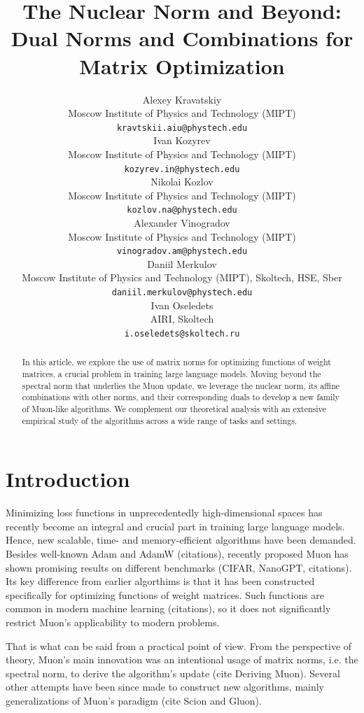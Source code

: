 \documentclass{article} %
\title{The Nuclear Norm and Beyond: Dual Norms and Combinations for Matrix Optimization}
\author{Alexey Kravatskiy \\
Moscow Institute of Physics and Technology (MIPT) \\
\texttt{kravtskii.aiu@phystech.edu} \\
\And
Ivan Kozyrev \\
Moscow Institute of Physics and Technology (MIPT) \\
\texttt{kozyrev.in@phystech.edu} \\
\And
Nikolai Kozlov \\
Moscow Institute of Physics and Technology (MIPT) \\
\texttt{kozlov.na@phystech.edu} \\
\And
Alexander Vinogradov \\
Moscow Institute of Physics and Technology (MIPT) \\
\texttt{vinogradov.am@phystech.edu} \\
\And
Daniil Merkulov \\
Moscow Institute of Physics and Technology (MIPT), Skoltech, HSE, Sber \\
\texttt{daniil.merkulov@phystech.edu} \\
\And
Ivan Oseledets \\
AIRI, Skoltech \\
\texttt{i.oseledets@skoltech.ru}
}
\begin{document}
\maketitle

\begin{abstract}
In this article, we explore the use of matrix norms for optimizing functions of weight matrices, a crucial problem in training large language models. Moving beyond the spectral norm that underlies the Muon update, we leverage the nuclear norm, its affine combinations with other norms, and their corresponding duals to develop a new family of Muon-like algorithms. We complement our theoretical analysis with an extensive empirical study of the algorithms across a wide range of tasks and settings.
\end{abstract}


\section{Introduction}
 Minimizing loss functions in unprecedentedly high-dimensional spaces has recently become an integral and crucial part in training large language models. Hence, new scalable, time- and memory-efficient algorithms have been demanded. Besides well-known Adam and AdamW (citations), recently proposed Muon has shown promising results on different benchmarks (CIFAR, NanoGPT, citations). Its key difference from earlier algorthims is that it has been constructed specifically for optimizing functions of weight matrices. Such functions are common in modern machine learning (citations), so it does not significantly restrict Muon's applicability to modern problems.

 That is what can be said from a practical point of view. From the perspective of theory, Muon's main innovation was an intentional usage of matrix norms, i.e. the spectral norm, to derive the algorithm's update (cite Deriving Muon). Several other attempts have been since made to construct new algorithms, mainly generalizations of Muon's paradigm (cite Scion and Gluon).
\end{document}
